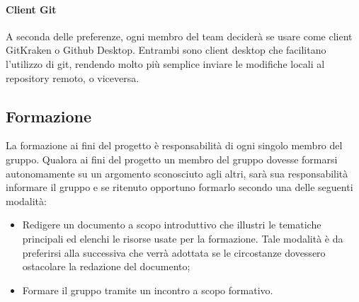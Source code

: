 \paragraph{Client Git}\Spazio
A seconda delle preferenze, ogni membro del team deciderà se usare come client GitKraken o Github Desktop. Entrambi sono client desktop che facilitano l'utilizzo di git, rendendo molto più semplice inviare le modifiche locali al repository remoto, o viceversa.
\subsection{Formazione}
La formazione ai fini del progetto è responsabilità di ogni singolo membro del gruppo. Qualora ai fini del progetto un membro del gruppo dovesse formarsi autonomamente su un argomento sconosciuto agli altri, sarà sua responsabilità informare il gruppo e se ritenuto opportuno formarlo secondo una delle seguenti modalità:
\begin{itemize}
\item Redigere un documento a scopo introduttivo che illustri le tematiche principali ed
elenchi le risorse usate per la formazione. Tale modalità è da preferirsi alla successiva che verrà adottata se le circostanze dovessero ostacolare la redazione del documento;
\item Formare il gruppo tramite un incontro a scopo formativo.
\end{itemize}
\pagebreak
